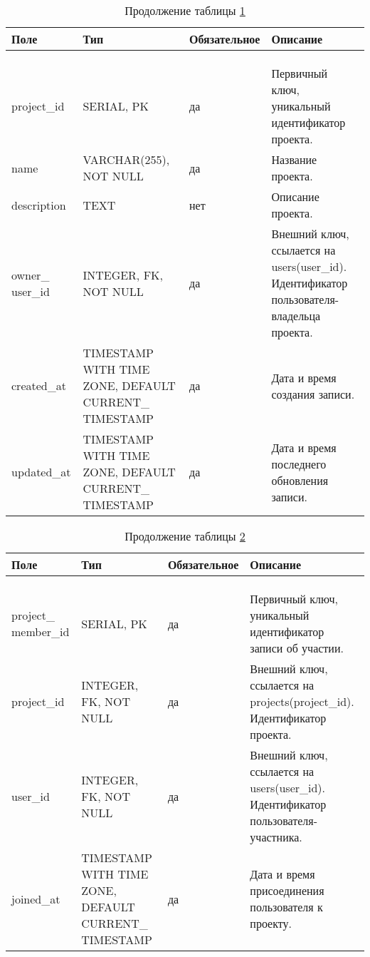 \begin{xltabular}{\textwidth}{|p{2.5cm}|p{4cm}|p{1.7cm}|X|}
	\caption{Атрибуты сущности «Projects»\label{projects:table}}\\ \hline
	\centrow Поле & \centrow Тип & \centrow Обяза\-тельное & \centrow Описание \\ \hline
	 &  &  &  \\ \hline
	\endfirsthead
	\caption*{Продолжение таблицы \ref{projects:table}} \\ \hline
	 &  &  &  \\ \hline
	\finishhead
	project\_id & SERIAL, PK & \centrow да & Первичный ключ, уникальный идентификатор проекта. \\ \hline
	name & VARCHAR(255), NOT NULL & \centrow да & Название проекта. \\ \hline
	description & TEXT & \centrow нет & Описание проекта. \\ \hline
	owner\_ user\_id & INTEGER, FK, NOT NULL & \centrow да & Внешний ключ, ссылается на users(user\_id). Идентификатор пользователя-владельца проекта. \\ \hline
	created\_at & TIMESTAMP WITH TIME ZONE, DEFAULT CURRENT\_ TIMESTAMP & \centrow да & Дата и время создания записи. \\ \hline
	updated\_at & TIMESTAMP WITH TIME ZONE, DEFAULT CURRENT\_ TIMESTAMP & \centrow да & Дата и время последнего обновления записи. \\ \hline
\end{xltabular}

\begin{xltabular}{\textwidth}{|p{2.5cm}|p{4cm}|p{1.7cm}|X|}
	\caption{Атрибуты сущности «Project Members»\label{projectmembers:table}}\\ \hline
	\centrow Поле & \centrow Тип & \centrow Обяза\-тельное & \centrow Описание \\ \hline
	 &  &  &  \\ \hline
	\endfirsthead
	\caption*{Продолжение таблицы \ref{projectmembers:table}} \\ \hline
	 &  &  &  \\ \hline
	\finishhead
	project\_ member\_id & SERIAL, PK & \centrow да & Первичный ключ, уникальный идентификатор записи об участии. \\ \hline
	project\_id & INTEGER, FK, NOT NULL & \centrow да & Внешний ключ, ссылается на projects(project\_id). Идентификатор проекта. \\ \hline
	user\_id & INTEGER, FK, NOT NULL & \centrow да & Внешний ключ, ссылается на users(user\_id). Идентификатор пользователя-участника. \\ \hline
	joined\_at & TIMESTAMP WITH TIME ZONE, DEFAULT CURRENT\_ TIMESTAMP & \centrow да & Дата и время присоединения пользователя к проекту. \\ 
	\hline
\end{xltabular}

